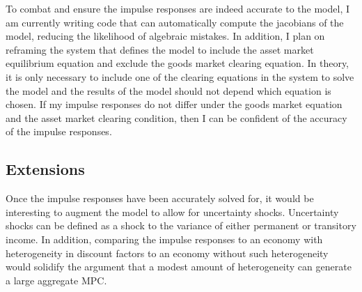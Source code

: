 \documentclass[titlepage]{\econtex}\providecommand{\texname}{BufferStockTheory}
\providecommand{\FigDir}{Figures}
\begin{document}
To combat and ensure the impulse responses are indeed accurate to the model, I am currently writing code that can automatically compute the jacobians of the model, reducing the likelihood of algebraic mistakes. In addition, I plan on reframing the system that defines the model to include the asset market equilibrium equation and exclude the goods market clearing equation. In theory, it is only necessary to include one of the clearing equations in the system to solve the model and the results of the model should not depend which equation is chosen. If my impulse responses do not differ under the goods market equation and the asset market clearing condition, then I can be confident of the accuracy of the impulse responses. \\


\hypertarget{Extensions }{}
\subsection{Extensions }

Once the impulse responses have been accurately solved for, it would be interesting to augment the model to allow for uncertainty shocks. Uncertainty shocks can be defined as a shock to the variance of either permanent or transitory income. In addition, comparing the impulse responses to an economy with heterogeneity in discount factors to an economy without such heterogeneity would solidify the argument that a modest amount of heterogeneity can generate a large aggregate MPC. 






















\end{document}
